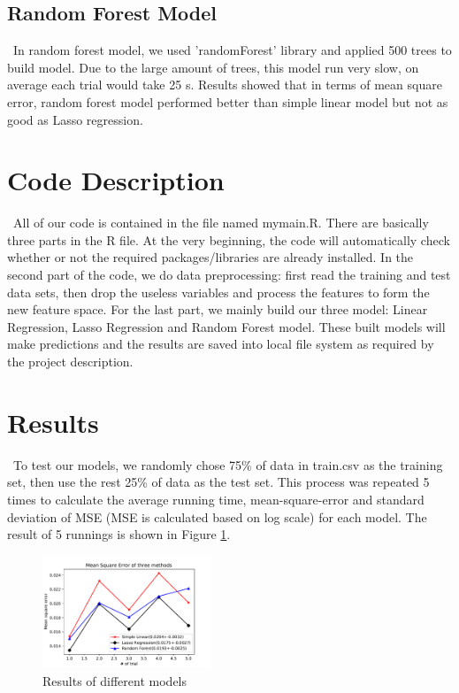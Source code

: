 \documentclass[12pt]{article}
\begin{document}
\subsection{Random Forest Model}
\quad\ In random forest model, we used 'randomForest' library and  applied 500 trees to build model. Due to the large amount of trees, this model run very slow, on average each trial would take 25 s. Results showed that in terms of mean square error, random forest model performed better than simple linear model but not as good as Lasso regression.


\section{Code Description}
\quad\ All of our code is contained in the file named mymain.R. There are basically three parts in the R file. At the very beginning, the code will automatically check whether or not the required packages/libraries are already installed. In the second part of the code, we do data preprocessing: first read the training and test data sets, then drop the useless variables and process the features to form the new feature space. For the last part, we mainly build our three model: Linear Regression, Lasso Regression and Random Forest model. These built models will make predictions and the results are saved into local file system as required by the project description.

\section{Results}

\quad\ To test our models, we randomly chose 75\% of data in train.csv as the training set, then use the rest 25\% of data as the test set. This process was repeated 5 times to calculate the average running time, mean-square-error and standard deviation of MSE (MSE is calculated based on log scale) for each model. The result of 5 runnings is shown in Figure \ref{fig:autoencoder}.

\begin{figure}[htb]
\centering
\includegraphics[width=0.45\textwidth]{./figures/MSE_3_methods.pdf}
\caption{Results of different models}
\label{fig:autoencoder}
\end{figure}
\end{document}
